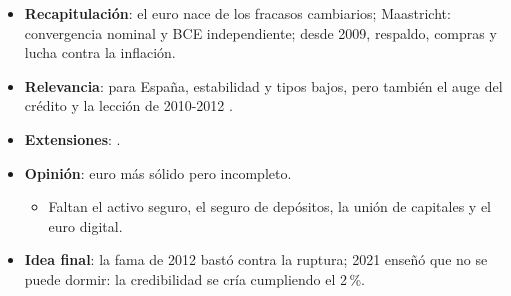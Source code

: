 \documentclass{article}
\begin{document}
\begin{columnas}
\begin{itemize}
\item \textbf{Recapitulación}: el euro nace de los fracasos cambiarios; Maastricht: convergencia nominal y BCE independiente; desde 2009, respaldo, compras y lucha contra la inflación.
\item \textbf{Relevancia}: para España, estabilidad y tipos bajos, pero también el auge del crédito y la lección de 2010-2012 .
\item \textbf{Extensiones}:     .
\item \textbf{Opinión}: euro más sólido pero incompleto.
  \begin{itemize}
  \item Faltan el activo seguro, el seguro de depósitos, la unión de capitales y el euro digital.
  \end{itemize}
\item \textbf{Idea final}: la fama de 2012 bastó contra la ruptura; 2021 enseñó que no se puede dormir: la credibilidad se cría cumpliendo el 2\,\%.
\end{itemize}


\end{columnas}
\end{document}
